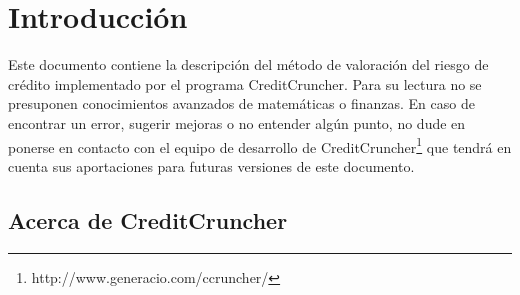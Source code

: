 
%
%
%
%
%
%
%
%

\chapter{Introducci\'on}
\label{sec:introduction}

Este documento contiene la descripci\'on del m\'etodo de valoraci\'on del riesgo
de cr\'edito implementado por el programa CreditCruncher. Para su lectura no se 
presuponen conocimientos avanzados de matem\'aticas o finanzas. En caso de 
encontrar un error, sugerir mejoras o no entender alg\'un punto,
no dude en ponerse en contacto con el equipo de desarrollo de 
CreditCruncher\footnote{http://www.generacio.com/ccruncher/} que tendr\'a en 
cuenta sus aportaciones para futuras versiones de este documento.


\section{Acerca de CreditCruncher}


